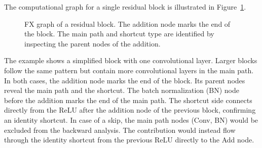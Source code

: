 \documentclass[
12pt,
fancyheadings,
a4paper,
twoside,
BCOR=0.7cm,
nobcorignoretitle,
grayscalebody,
]{stsreprt}
\begin{document}
The computational graph for a single residual block is illustrated in
Figure~\ref{fig:block_detection}.
\begin{figure}[ht!]
    \centering
    \caption{FX graph of a residual block. The addition node marks the end of the block. The main path and shortcut type are identified by inspecting the parent nodes of the addition.}
    \label{fig:block_detection}
\end{figure}

The example shows a simplified block with one convolutional layer.
Larger blocks follow the same pattern but contain more convolutional layers in the main path.
In both cases, the addition node marks the end of the block.
Its parent nodes reveal the main path and the shortcut.
The batch normalization (BN) node before the addition marks the end of the main path. The shortcut
side connects directly from the ReLU after the addition node of the previous block, confirming an
identity shortcut.
In case of a skip, the main path nodes (Conv, BN) would be excluded from the backward analysis. The
contribution would instead flow through the identity shortcut from the previous ReLU directly to
the Add node.
\end{document}
